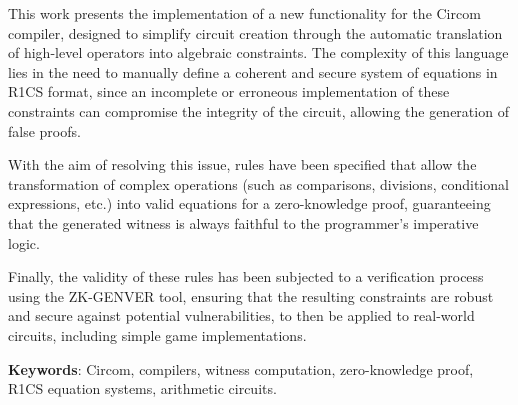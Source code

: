 \documentclass[a4paper,12pt]{report}
\newenvironment{abstract_in}{%
	\begin{center}
		\bfseries\Large Abstract
	\end{center}
	\vspace{0.5cm}
	\noindent 
}{
	\par\vspace{1cm}
}
\begin{document}
	\cleardoublepage 
	\renewcommand{\abstractname}{Abstract} 
	\begin{abstract_in}
		This work presents the implementation of a new functionality for the Circom compiler, designed to simplify circuit creation through the automatic translation of high-level operators into algebraic constraints. The complexity of this language lies in the need to manually define a coherent and secure system of equations in R1CS format, since an incomplete or erroneous implementation of these constraints can compromise the integrity of the circuit, allowing the generation of false proofs.
		
		\vspace{0.2cm}
		\noindent
		With the aim of resolving this issue, rules have been specified that allow the transformation of complex operations (such as comparisons, divisions, conditional expressions, etc.) into valid equations for a zero-knowledge proof, guaranteeing that the generated witness is always faithful to the programmer's imperative logic.
		
		
		\vspace{0.2cm}
		\noindent
		Finally, the validity of these rules has been subjected to a verification process using the ZK-GENVER tool, ensuring that the resulting constraints are robust and secure against potential vulnerabilities, to then be applied to real-world circuits, including simple game implementations.
		
		\vspace{0.5cm}
		
		\noindent \textbf{Keywords}: Circom, compilers, witness computation, zero-knowledge proof, R1CS equation systems, arithmetic circuits.
	\end{abstract_in}
	
	\newpage 
	
\end{document}
